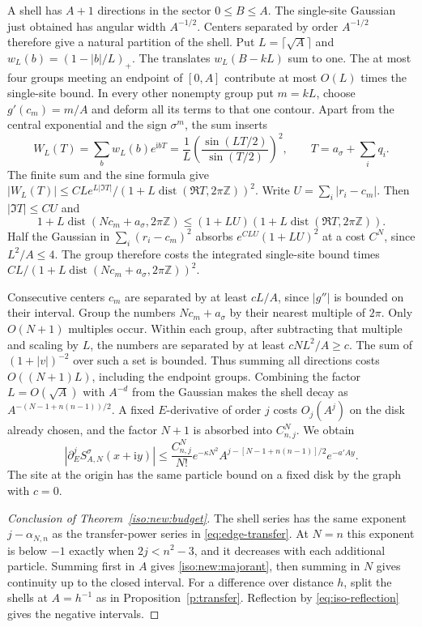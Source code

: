 \documentclass[11pt]{article}
\numberwithin{equation}{section}
\theoremstyle{definition}
\newcommand{\Z}{\mathbb Z}
\newcommand{\ii}{\mathrm i}
\DeclareMathOperator{\dist}{dist}
\begin{document}
A shell has $A+1$ directions in the sector $0\le B\le A$. The single-site
Gaussian just obtained has angular width $A^{-1/2}$. Centers separated
by order $A^{-1/2}$ therefore give a natural partition of the shell.
Put $L=\lceil\sqrt A\rceil$ and $w_L(b)=(1-|b|/L)_+$.
The translates $w_L(B-kL)$ sum to one. The at most four groups meeting
an endpoint of $[0,A]$ contribute at most $O(L)$ times the single-site
bound. In every other nonempty group put $m=kL$, choose $g'(c_m)=m/A$
and deform all its terms to that one contour. Apart from the central
exponential and the sign $\sigma^m$, the sum inserts
\[
 W_L(T)=\sum_b w_L(b)e^{\ii bT}
 =\frac1L\left(\frac{\sin(LT/2)}{\sin(T/2)}\right)^2,\qquad
 T=a_\sigma+\sum_i q_i .
\]
The finite sum and the sine formula give
$|W_L(T)|\le CL e^{L|\Im T|}/(1+L\dist(\Re T,2\pi\Z))^2$.
Write $U=\sum_i|r_i-c_m|$. Then $|\Im T|\le C U$ and
\[
 1+L\dist(Nc_m+a_\sigma,2\pi\Z)
 \le(1+LU)(1+L\dist(\Re T,2\pi\Z)).
\]
Half the Gaussian in $\sum_i(r_i-c_m)^2$ absorbs
$e^{CLU}(1+LU)^2$ at a cost $C^N$, since $L^2/A\le4$.
The group therefore costs the integrated single-site bound times
$CL/(1+L\dist(Nc_m+a_\sigma,2\pi\Z))^2$.

Consecutive centers $c_m$ are separated by at least $cL/A$,
since $|g''|$ is bounded on their interval. Group the numbers
$Nc_m+a_\sigma$ by their nearest multiple of $2\pi$. Only $O(N+1)$
multiples occur. Within each group, after subtracting that
multiple and scaling by $L$, the numbers are separated by at least
$cNL^2/A\ge c$. The sum of $(1+|v|)^{-2}$ over such a set is bounded.
Thus summing all directions costs $O((N+1)L)$, including the endpoint
groups. Combining the factor $L=O(\sqrt A)$ with $A^{-d}$ from the
Gaussian makes the shell decay as $A^{-(N-1+n(n-1))/2}$. A fixed
$E$-derivative of order $j$ costs $O_j(A^j)$ on the disk already
chosen, and the factor $N+1$ is absorbed into $C_{n,j}^N$. We obtain
\begin{equation}\label{eq:iso-shell-est}
 |\partial_E^j S_{A,N}^\sigma(x+\ii y)|
 \le\frac{C_{n,j}^N}{N!}e^{-\kappa N^2}
     A^{j-[N-1+n(n-1)]/2}e^{-a'Ay}.
\end{equation}
The site at the origin has the same particle bound on a fixed disk
by the graph with $c=0$.

\begin{proof}[Conclusion of Theorem~\ref{iso:new:budget}]
The shell series has the same exponent $j-\alpha_{N,n}$ as the
transfer-power series in \eqref{eq:edge-transfer}. At $N=n$ this
exponent is below $-1$ exactly when $2j<n^2-3$, and it decreases
with each additional particle. Summing first in $A$ gives
\eqref{iso:new:majorant}, then summing in $N$ gives continuity up
to the closed interval. For a difference over distance $h$, split the
shells at $A=h^{-1}$ as in Proposition~\ref{p:transfer}. Reflection
by \eqref{eq:iso-reflection} gives the negative intervals.
\end{proof}
\end{document}
